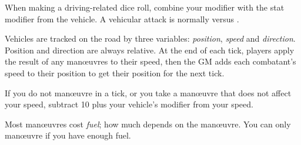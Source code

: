 
When making a driving-related dice roll, combine your  modifier with the stat modifier from the vehicle. A vehicular attack is normally  versus .

Vehicles are tracked on the road by three variables: \emph{position}, \emph{speed} and \emph{direction}. Position and direction are always relative. At the end of each tick, players apply the result of any man\oe{}uvres to their speed, then the GM adds each combatant's speed to their position to get their position for the next tick.

If you do not man\oe{}uvre in a tick, or you take a man\oe{}uvre that does not affect your speed, subtract 10 plus your vehicle's  modifier from your speed.

Most man\oe{}uvres cost \emph{fuel}; how much depends on the man\oe{}uvre. You can only man\oe{}uvre if you have enough fuel.
